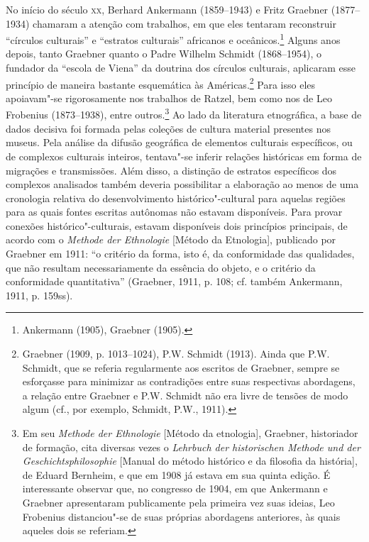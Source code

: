 No início do século \textsc{xx}, Berhard Ankermann (1859--1943) e Fritz Graebner
(1877--1934) chamaram a atenção com trabalhos, em que eles tentaram
reconstruir ``círculos culturais'' e ``estratos culturais'' africanos e
oceânicos.\footnote{Ankermann (1905), Graebner (1905).} Alguns anos
depois, tanto Graebner quanto o Padre Wilhelm Schmidt (1868--1954), o
fundador da ``escola de Viena'' da doutrina dos círculos culturais,
aplicaram esse princípio de maneira bastante esquemática às
Américas.\footnote{Graebner (1909, p. 1013--1024), P.W. Schmidt (1913).
  Ainda que P.W. Schmidt, que se referia regularmente aos escritos de
  Graebner, sempre se esforçasse para minimizar as contradições entre
  suas respectivas abordagens, a relação entre Graebner e P.W. Schmidt
  não era livre de tensões de modo algum (cf., por exemplo, Schmidt,
  P.W., 1911).} Para isso eles apoiavam"-se rigorosamente nos trabalhos
de Ratzel, bem como nos de Leo Frobenius (1873--1938), entre
outros.\footnote{Em seu \emph{Methode der Ethnologie} {[}Método da
  etnologia{]}, Graebner, historiador de formação, cita diversas vezes
  o \emph{Lehrbuch der historischen Methode und der
  Geschichtsphilosophie} {[}Manual do método histórico e da filosofia da
  história{]}, de Eduard Bernheim, e que em 1908 já estava em sua quinta
  edição. É interessante observar que, no congresso de 1904, em que
  Ankermann e Graebner apresentaram publicamente pela primeira vez suas
  ideias, Leo Frobenius distanciou"-se de suas próprias abordagens
  anteriores, às quais aqueles dois se referiam.} Ao lado da literatura
etnográfica, a base de dados decisiva foi formada pelas coleções de
cultura material presentes nos museus. Pela análise da difusão
geográfica de elementos culturais específicos, ou de complexos
culturais inteiros, tentava"-se inferir relações históricas em forma de
migrações e transmissões. Além disso, a distinção de estratos
específicos dos complexos analisados também deveria possibilitar a
elaboração ao menos de uma cronologia relativa do desenvolvimento
histórico"-cultural para aquelas regiões para as quais fontes escritas
autônomas não estavam disponíveis. Para provar conexões
histórico"-culturais, estavam disponíveis dois princípios principais, de
acordo com o \emph{Methode der Ethnologie} {[}Método da Etnologia{]},
publicado por Graebner em 1911: ``o critério da forma, isto é, da
conformidade das qualidades, que não resultam necessariamente da
essência do objeto, e o critério da conformidade quantitativa''
(Graebner, 1911, p. 108; cf. também Ankermann, 1911, p. 159ss).


